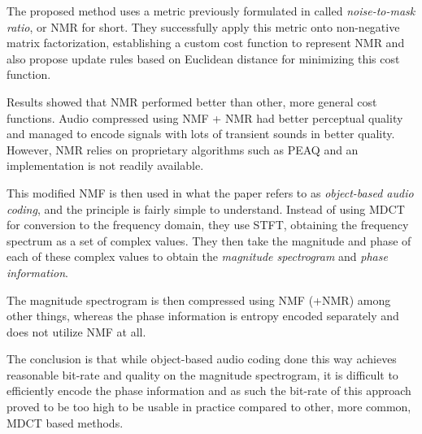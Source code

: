 The proposed method uses a metric previously formulated in \cite{Nikunen2010NoisetomaskRM} called \emph{noise-to-mask ratio}, or NMR for short. They successfully apply this metric onto non-negative matrix factorization, establishing a custom cost function to represent NMR and also propose update rules based on Euclidean distance for minimizing this cost function.

Results showed that NMR performed better than other, more general cost functions. Audio compressed using NMF + NMR had better perceptual quality and managed to encode signals with lots of transient sounds in better quality. However, NMR relies on proprietary algorithms such as PEAQ \cite{peaq_2006} and an implementation is not readily available.

This modified NMF is then used in what the paper refers to as \emph{object-based audio coding}, and the principle is fairly simple to understand. Instead of using MDCT for conversion to the frequency domain, they use STFT, obtaining the frequency spectrum as a set of complex values. They then take the magnitude and phase of each of these complex values to obtain the \emph{magnitude spectrogram} and \emph{phase information}.

The magnitude spectrogram is then compressed using NMF (+NMR) among other things, whereas the phase information is entropy encoded separately and does not utilize NMF at all.

The conclusion is that while object-based audio coding done this way achieves reasonable bit-rate and quality on the magnitude spectrogram, it is difficult to efficiently encode the phase information and as such the bit-rate of this approach proved to be too high to be usable in practice compared to other, more common, MDCT based methods.

